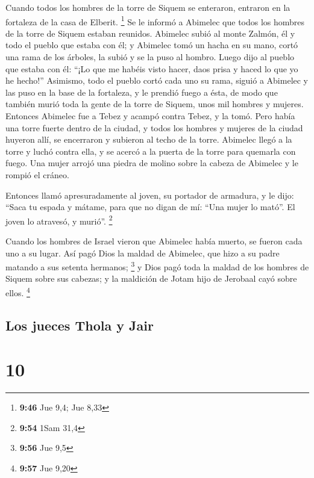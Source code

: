  Cuando todos los hombres de la torre de Siquem se
enteraron, entraron en la fortaleza de la casa de Elberit. \footnote{\textbf{9:46}
  Jue 9,4; Jue 8,33}  Se le informó a Abimelec que todos
los hombres de la torre de Siquem estaban reunidos. 
Abimelec subió al monte Zalmón, él y todo el pueblo que estaba con él; y
Abimelec tomó un hacha en su mano, cortó una rama de los árboles, la
subió y se la puso al hombro. Luego dijo al pueblo que estaba con él:
``¡Lo que me habéis visto hacer, daos prisa y haced lo que yo he
hecho!''  Asimismo, todo el pueblo cortó cada uno su
rama, siguió a Abimelec y las puso en la base de la fortaleza, y le
prendió fuego a ésta, de modo que también murió toda la gente de la
torre de Siquem, unos mil hombres y mujeres.  Entonces
Abimelec fue a Tebez y acampó contra Tebez, y la tomó. 
Pero había una torre fuerte dentro de la ciudad, y todos los hombres y
mujeres de la ciudad huyeron allí, se encerraron y subieron al techo de
la torre.  Abimelec llegó a la torre y luchó contra ella,
y se acercó a la puerta de la torre para quemarla con fuego.
 Una mujer arrojó una piedra de molino sobre la cabeza de
Abimelec y le rompió el cráneo.

 Entonces llamó apresuradamente al joven, su portador de
armadura, y le dijo: ``Saca tu espada y mátame, para que no digan de mí:
``Una mujer lo mató''. El joven lo atravesó, y murió''. \footnote{\textbf{9:54}
  1Sam 31,4}

 Cuando los hombres de Israel vieron que Abimelec había
muerto, se fueron cada uno a su lugar.  Así pagó Dios la
maldad de Abimelec, que hizo a su padre matando a sus setenta hermanos;
\footnote{\textbf{9:56} Jue 9,5}  y Dios pagó toda la
maldad de los hombres de Siquem sobre sus cabezas; y la maldición de
Jotam hijo de Jerobaal cayó sobre ellos. \footnote{\textbf{9:57} Jue
  9,20}

\hypertarget{los-jueces-thola-y-jair}{%
\subsection{Los jueces Thola y Jair}\label{los-jueces-thola-y-jair}}

\hypertarget{section-9}{%
\section{10}\label{section-9}}

